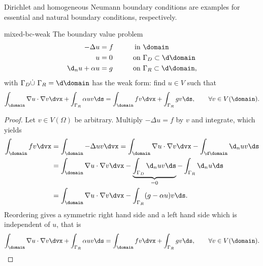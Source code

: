 \begin{remark}
  Dirichlet and homogeneous Neumann boundary conditions are examples
  for essential and natural boundary conditions, respectively.
\end{remark}

\begin{Lemma}{mixed-bc-weak}
  The boundary value problem
  \begin{gather}
    \label{eq:ex-ess-bc}
    \begin{aligned}
      -\Delta u &= f &\qquad \text{in } &\domain\\
      u &= 0 &\text{on } &\Gamma_D \subset \d\domain\\
      \d_n u + \alpha u &= g &\text{on } &\Gamma_R \subset \d\domain,
    \end{aligned}
  \end{gather}
  with $\Gamma_D\dot\cup\ \Gamma_R = \d\domain$ has the weak form: find $u\in V$ such that
  \begin{gather}
    \int_{\domain} \nabla u\cdot\nabla v \dvx
    + \int_{\Gamma_R}\alpha u v \ds
    = \int_{\domain} f v\dvx
    + \int_{\Gamma_R} g v \ds, \qquad\forall v\in V(\domain).    
  \end{gather}
\end{Lemma}

\begin{proof}
  Let $v\in V(\Omega)$ be arbitrary. Multiply $-\Delta u = f$ by $v$ and
  integrate, which yields
  \begin{gather*}
    \begin{aligned}
      \int_\domain fv \dvx &= \int_\domain -\Delta u v\dvx = \int_\domain \nabla u \cdot \nabla v\dvx - \int_{\d\domain} \d_n u v \ds \\
      &= \int_\domain \nabla u \cdot \nabla v \dvx - \underbrace{\int_{\Gamma_D} \d_n u v \ds}_{=0} - \int_{\Gamma_R} \d_n u \ds \\
      &= \int_\domain \nabla u \cdot \nabla v \dvx - \int_{\Gamma_R} (g - \alpha u) v\ds.
      \end{aligned}
  \end{gather*}
  Reordering gives a symmetric right hand side and a left hand
  side which is independent of $u$, that is
  \begin{gather*}
    \int_{\domain} \nabla u\cdot\nabla v \dvx
    + \int_{\Gamma_R}\alpha u v \ds
    = \int_{\domain} f v\dvx
    + \int_{\Gamma_R} g v \ds, \qquad\forall v\in V(\domain).
  \end{gather*}
\end{proof}

